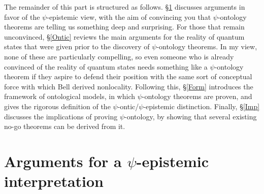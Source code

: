 \documentclass[DIV=calc,fontsize=12pt]{scrartcl} %
\theoremstyle{definition}
\theoremstyle{plain}
\begin{document}
The remainder of this part is structured as follows.  \S\ref{PsiEp}
discusses arguments in favor of the $\psi$-epistemic view, with the
aim of convincing you that $\psi$-ontology theorems are telling us
something deep and surprising.  For those that remain unconvinced,
\S\ref{Ontic} reviews the main arguments for the reality of quantum
states that were given prior to the discovery of $\psi$-ontology
theorems.  In my view, none of these are particularly compelling, so
even someone who is already convinced of the reality of quantum states
needs something like a $\psi$-ontology theorem if they aspire to
defend their position with the same sort of conceptual force with
which Bell derived nonlocality.  Following this, \S\ref{Form}
introduces the framework of ontological models, in which
$\psi$-ontology theorems are proven, and gives the rigorous definition
of the $\psi$-ontic/$\psi$-epistemic distinction.  Finally,
\S\ref{Imp} discusses the implications of proving $\psi$-ontology, by
showing that several existing no-go theorems can be derived from it.

\section{Arguments for a $\psi$-epistemic interpretation}

\label{PsiEp}
\end{document}
